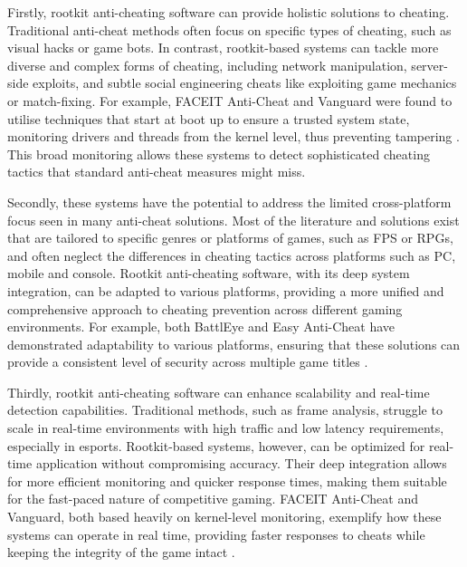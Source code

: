 \documentclass[a4paper, 12pt]{article}
\begin{document}
Firstly, rootkit anti-cheating software can provide holistic solutions to cheating. Traditional anti-cheat methods often focus on specific types of cheating, such as visual hacks or game bots. In contrast, rootkit-based systems can tackle more diverse and complex forms of cheating, including network manipulation, server-side exploits, and subtle social engineering cheats like exploiting game mechanics or match-fixing. For example, FACEIT Anti-Cheat and Vanguard were found to utilise techniques that start at boot up to ensure a trusted system state, monitoring drivers and threads from the kernel level, thus preventing tampering \cite{dorner_2024_if}. This broad monitoring allows these systems to detect sophisticated cheating tactics that standard anti-cheat measures might miss.

Secondly, these systems have the potential to address the limited cross-platform focus seen in many anti-cheat solutions. Most of the literature and solutions exist that are tailored to specific genres or platforms of games, such as FPS or RPGs, and often neglect the differences in cheating tactics across platforms such as PC, mobile and console. Rootkit anti-cheating software, with its deep system integration, can be adapted to various platforms, providing a more unified and comprehensive approach to cheating prevention across different gaming environments. For example, both BattlEye and Easy Anti-Cheat have demonstrated adaptability to various platforms, ensuring that these solutions can provide a consistent level of security across multiple game titles \cite{dorner_2024_if}.

Thirdly, rootkit anti-cheating software can enhance scalability and real-time detection capabilities. Traditional methods, such as frame analysis, struggle to scale in real-time environments with high traffic and low latency requirements, especially in esports. Rootkit-based systems, however, can be optimized for real-time application without compromising accuracy. Their deep integration allows for more efficient monitoring and quicker response times, making them suitable for the fast-paced nature of competitive gaming. FACEIT Anti-Cheat and Vanguard, both based heavily on kernel-level monitoring, exemplify how these systems can operate in real time, providing faster responses to cheats while keeping the integrity of the game intact \cite{dorner_2024_if}.
\end{document}
